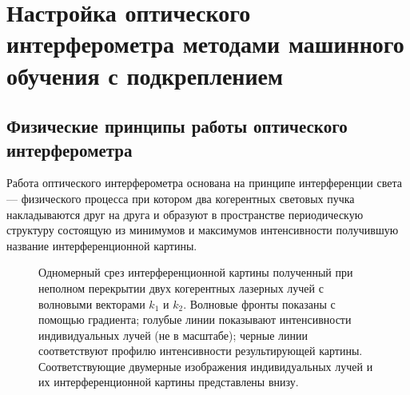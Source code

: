 \chapter{Настройка оптического интерферометра методами машинного обучения с подкреплением}\label{ch:ch2}

\section{Физические принципы работы оптического интерферометра}\label{sec:ch2/sec1}

Работа оптического интерферометра основана на принципе интерференции света --- физического процесса при котором два когерентных световых пучка накладываются друг на друга и образуют в пространстве периодическую структуру состоящую из минимумов и максимумов интенсивности получившую название интерференционной картины. 

\begin{figure}[ht]
    \caption{Одномерный срез интерференционной картины полученный при неполном перекрытии двух когерентных лазерных лучей с волновыми векторами $k_1$ и $k_2$. Волновые фронты показаны с помощью градиента; голубые линии показывают интенсивности индивидуальных лучей (не в масштабе); черные линии соответствуют профилю интенсивности результирующей картины. Соответствующие двумерные изображения индивидуальных лучей и их интерференционной картины представлены внизу.}\label{fig:two_beam_interf}
\end{figure}

